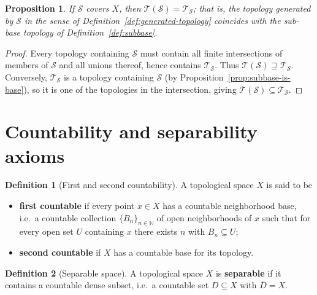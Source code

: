 \documentclass[11pt,a4paper,twoside]{book}
\newtheorem{proposition}[theorem]{Proposition}
\theoremstyle{remark}
\theoremstyle{definition}
\theoremstyle{definition}
\newtheorem{definition}{Definition}[section]
\begin{document}
\begin{proposition}
\label{prop:generated-equals-subbase}
If $\mathscr{S}$ covers $X$, then
$\mathscr{T}(\mathscr{S})=\mathscr{T}_{\mathscr{S}}$; that is, the topology
generated by $\mathscr{S}$ in the sense of
Definition~\ref{def:generated-topology} coincides with the sub-base topology of
Definition~\ref{def:subbase}.
\end{proposition}

\begin{proof}
Every topology containing $\mathscr{S}$ must contain all finite intersections
of members of $\mathscr{S}$ and all unions thereof, hence contains
$\mathscr{T}_{\mathscr{S}}$.  Thus
$\mathscr{T}(\mathscr{S})\supseteq\mathscr{T}_{\mathscr{S}}$.  Conversely,
$\mathscr{T}_{\mathscr{S}}$ is a topology containing $\mathscr{S}$ (by
Proposition~\ref{prop:subbase-is-base}), so it is one of the topologies in the
intersection, giving
$\mathscr{T}(\mathscr{S})\subseteq\mathscr{T}_{\mathscr{S}}$.
\end{proof}

\section{Countability and separability axioms}
\label{sec:countability}

\begin{definition}[First and second countability]
\label{def:countability-axioms}
A topological space $X$ is said to be
\begin{itemize}
    \item \textbf{first countable} if every point $x\in X$ has a countable
        neighborhood base, i.e.\ a countable collection
        $\{B_n\}_{n\in\mathbb{N}}$ of open neighborhoods of $x$ such that for
        every open set $U$ containing $x$ there exists $n$ with
        $B_n\subseteq U$;
    \item \textbf{second countable} if $X$ has a countable base for its
        topology.
\end{itemize}
\end{definition}

\begin{definition}[Separable space]
\label{def:separable}
A topological space $X$ is \textbf{separable} if it contains a countable dense
subset, i.e.\ a countable set $D\subseteq X$ with $\overline{D}=X$.
\end{definition}
\end{document}
